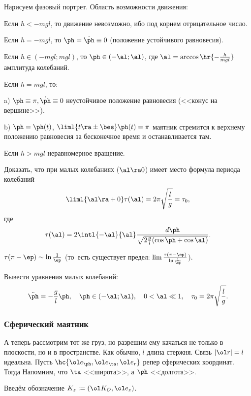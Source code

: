 \documentclass[a4paper,12pt]{article}
\def\F{\ol F}
\def\r{\ol r}
\def\e{\ol e}
\def\K{\ol K_O}
\def\dd{\ddot}
\def\d{\dot}
\newcommand{\ez}{\equiv0}
\begin{document}
Нарисуем фазовый портрет. Область возможности движения:
\begin{items}{-1}
\item Если $h<-mgl$, то движение невозможно, ибо под корнем отрицательное число.
\item Если $h=-mgl$, то $\ph=\d\ph\ez$ (положение устойчивого равновесия).
\item Если $h\in(-mgl;mgl)$, то $\ph\in(-\al;\al)$, где $\al=\arccos\hr{-\frac{h}{mgl}}$ амплитуда колебаний.
\item Если $h=mgl$, то:

a) $\ph\equiv\pi, \d\ph\equiv0$ неустойчивое положение равновесия (<<конус на вершине>>).

b) $\ph=\ph(t)$, $\liml{t\ra\pm\bes}\ph(t)=\pi$ маятник стремится к верхнему положению равновесия за бесконечное
время и останавливается там.
\item Если $h>mgl$ неравномерное вращение.
\end{items}

\begin{problem}
Доказать, что при малых колебаниях ($\al \ra 0$) имеет место формула периода колебаний
$$\liml{\al\ra+0}\tau(\al)=2\pi \sqrt{\frac{l}{g}}=\tau_0,$$
где
$$\tau(\al)=2\intl{-\al}{\al}\frac{d\ph}{\sqrt{2\frac gl(\cos\ph+\cos\al)}}.$$
\end{problem}
\begin{problem}
$\tau(\pi-\ep)\sim\ln\frac1\ep$ (то~есть существует предел: $\lim\frac{\tau(\pi-\ep)}{\ln\frac1\ep}$).
\end{problem}
\begin{problem} Вывести уравнения малых колебаний:
$$\dd \ph=-\frac gl\ph, \quad \ph\in(-\al;\al), \quad 0<\al\ll 1, \quad \tau_0=2\pi\sqrt{\frac lg}.$$
\end{problem}

\subsubsection{Сферический маятник}

А теперь рассмотрим тот же груз, но разрешим ему качаться не только в плоскости, но и в пространстве.
Как обычно, $l$ длина стержня. Связь $|\r|=l$ идеальна.
Пусть $\hc{\e_\ph,\e_\ta,\e_r}$ репер сферических координат. Тогда
\eqn{\label{eqn:spherePendulum}m\dd\r=\ub{m\ol g+R\e_r}_{\F},\quad \frac12mv^2+V=h,\quad V=mgl\sin\ta.}
Напомним, что $\ta$ <<широта>>, а $\ph$ <<долгота>>.

Введём обозначение $K_z := (\K, \e_z)$.
\end{document}
